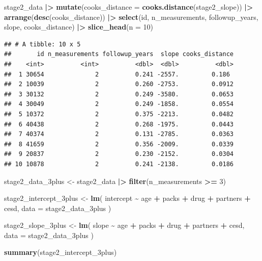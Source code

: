 \documentclass[
]{article}
\newenvironment{Shaded}{\begin{snugshade}}{\end{snugshade}}
\newcommand{\AttributeTok}[1]{\textcolor[rgb]{0.13,0.29,0.53}{#1}}
\newcommand{\DecValTok}[1]{\textcolor[rgb]{0.00,0.00,0.81}{#1}}
\newcommand{\FunctionTok}[1]{\textcolor[rgb]{0.13,0.29,0.53}{\textbf{#1}}}
\newcommand{\NormalTok}[1]{#1}
\newcommand{\OtherTok}[1]{\textcolor[rgb]{0.56,0.35,0.01}{#1}}
\newcommand{\SpecialCharTok}[1]{\textcolor[rgb]{0.81,0.36,0.00}{\textbf{#1}}}
\begin{document}
\begin{Shaded}
\begin{Highlighting}[]
\NormalTok{stage2\_data }\SpecialCharTok{|\textgreater{}}
  \FunctionTok{mutate}\NormalTok{(}\AttributeTok{cooks\_distance =} \FunctionTok{cooks.distance}\NormalTok{(stage2\_slope)) }\SpecialCharTok{|\textgreater{}}
  \FunctionTok{arrange}\NormalTok{(}\FunctionTok{desc}\NormalTok{(cooks\_distance)) }\SpecialCharTok{|\textgreater{}}
  \FunctionTok{select}\NormalTok{(id, n\_measurements, followup\_years,}
\NormalTok{         slope, cooks\_distance) }\SpecialCharTok{|\textgreater{}}
  \FunctionTok{slice\_head}\NormalTok{(}\AttributeTok{n =} \DecValTok{10}\NormalTok{)}
\end{Highlighting}
\end{Shaded}

\begin{verbatim}
## # A tibble: 10 x 5
##       id n_measurements followup_years  slope cooks_distance
##    <int>          <int>          <dbl>  <dbl>          <dbl>
##  1 30654              2          0.241 -2557.         0.186 
##  2 10039              2          0.260 -2753.         0.0912
##  3 30132              2          0.249 -3580.         0.0653
##  4 30049              2          0.249 -1858.         0.0554
##  5 10372              2          0.375 -2213.         0.0482
##  6 40438              2          0.268 -1975.         0.0443
##  7 40374              2          0.131 -2785.         0.0363
##  8 41659              2          0.356 -2009.         0.0339
##  9 20837              2          0.230 -2152.         0.0304
## 10 10878              2          0.241 -2138.         0.0186
\end{verbatim}

\begin{Shaded}
\begin{Highlighting}[]
\NormalTok{stage2\_data\_3plus }\OtherTok{\textless{}{-}}\NormalTok{ stage2\_data }\SpecialCharTok{|\textgreater{}}
  \FunctionTok{filter}\NormalTok{(n\_measurements }\SpecialCharTok{\textgreater{}=} \DecValTok{3}\NormalTok{)}

\NormalTok{stage2\_intercept\_3plus }\OtherTok{\textless{}{-}} \FunctionTok{lm}\NormalTok{(}
\NormalTok{  intercept }\SpecialCharTok{\textasciitilde{}}\NormalTok{ age }\SpecialCharTok{+}\NormalTok{ packs }\SpecialCharTok{+}\NormalTok{ drug }\SpecialCharTok{+}\NormalTok{ partners }\SpecialCharTok{+}\NormalTok{ cesd,}
  \AttributeTok{data =}\NormalTok{ stage2\_data\_3plus}
\NormalTok{)}

\NormalTok{stage2\_slope\_3plus }\OtherTok{\textless{}{-}} \FunctionTok{lm}\NormalTok{(}
\NormalTok{  slope }\SpecialCharTok{\textasciitilde{}}\NormalTok{ age }\SpecialCharTok{+}\NormalTok{ packs }\SpecialCharTok{+}\NormalTok{ drug }\SpecialCharTok{+}\NormalTok{ partners }\SpecialCharTok{+}\NormalTok{ cesd,}
  \AttributeTok{data =}\NormalTok{ stage2\_data\_3plus}
\NormalTok{)}

\FunctionTok{summary}\NormalTok{(stage2\_intercept\_3plus)}
\end{Highlighting}
\end{Shaded}
\end{document}
